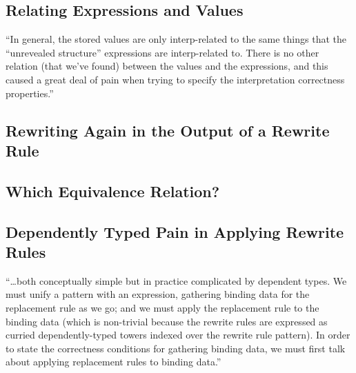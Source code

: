 \subsection{Relating Expressions and Values}
``In general, the stored values are only interp-related to the same things that the ``unrevealed structure'' expressions are interp-related to. There is no other relation (that we've found) between the values and the expressions, and this caused a great deal of pain when trying to specify the interpretation correctness properties.''
\subsection{Rewriting Again in the Output of a Rewrite Rule}
\subsection{Which Equivalence Relation?}
\subsection{Dependently Typed Pain in Applying Rewrite Rules}
``\ldots\space both conceptually simple but in practice complicated by dependent types.
We must unify a pattern with an expression, gathering binding data for the replacement rule as we go; and we must apply the replacement rule to the binding data (which is non-trivial because the rewrite rules are expressed as curried dependently-typed towers indexed over the rewrite rule pattern).
In order to state the correctness conditions for gathering binding data, we must first talk about applying replacement rules to binding data.''
